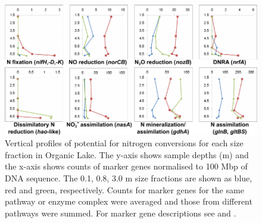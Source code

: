 \begin{figure}
\includegraphics{orglake_figures/n_cycle.pdf}
\caption[Vertical profiles of potential for nitrogen cycling in Organic Lake]{Vertical profiles of potential for nitrogen conversions for each size fraction in Organic Lake. The y-axis shows sample depths (m) and the x-axis shows counts of marker genes normalised to 100 Mbp of \textsc{DNA} sequence. The 0.1, 0.8, 3.0 \textmu{}m size fractions are shown as blue, red and green, respectively. Counts for marker genes for the same pathway or enzyme complex were averaged and those from different pathways were summed. For marker gene descriptions see  and .}
\label{fig:n_cycle}

\end{figure}
